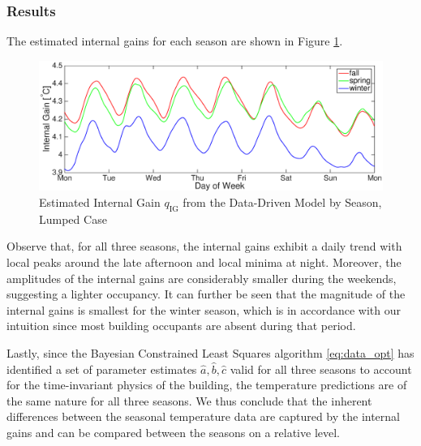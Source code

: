 \subsubsection{Results}
The estimated internal gains for each season are shown in Figure \ref{fig:qig_comparison_plot}.
\begin{figure}[hbtp]
\centering
\vspace*{-0.0cm}
\hspace*{-0.6cm}
\includegraphics[scale=0.35]{chapters/building_model/figures/data_lump_qig.eps}
\caption{Estimated Internal Gain $q_{\text{IG}}$ from the Data-Driven Model by Season, Lumped Case}
\vspace*{0.3cm}
\label{fig:qig_comparison_plot}
\end{figure}
Observe that, for all three seasons, the internal gains exhibit a daily trend with local peaks around the late afternoon and local minima at night. Moreover, the amplitudes of the internal gains are considerably smaller during the weekends, suggesting a lighter occupancy. It can further be seen that the magnitude of the internal gains is smallest for the winter season, which is in accordance with our intuition since most building occupants are absent during that period.


Lastly, since the Bayesian Constrained Least Squares algorithm \eqref{eq:data_opt} has identified a set of parameter estimates $\hat{a}, \hat{b}, \hat{c}$ valid for all three seasons to account for the time-invariant physics of the building, the temperature predictions are of the same nature for all three seasons. We thus conclude that the inherent differences between the seasonal temperature data are captured by the internal gains and can be compared between the seasons on a relative level.

